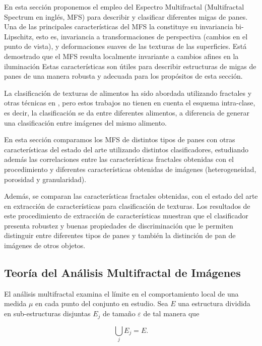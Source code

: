 En esta sección proponemos el empleo del Espectro Multifractal (Multifractal Spectrum en inglés, \acrshort{MFS}) \cite{Xu2009} para describir y clasificar diferentes migas de panes.
Una de las principales características del MFS la constituye su invariancia bi-Lipschitz, esto es, invariancia a transformaciones de perspectiva (cambios en el punto de vista), y deformaciones suaves de las texturas de las superficies.
Está demostrado que el MFS resulta localmente invariante a cambios afines en la iluminación
Estas características son útiles para describir estructuras de migas de panes de una manera robusta y adecuada para los propósitos de esta sección.

La clasificación de texturas de alimentos ha sido abordada utilizando fractales y otras técnicas en \cite{Zong2010,Bosch2011}, pero estos trabajos no tienen en cuenta el esquema intra-clase, es decir, la clasificación se da entre diferentes alimentos, a diferencia de generar una clasificación entre imágenes del mismo alimento.


En esta sección comparamos los MFS de distintos tipos de panes con otras características del estado del arte utilizando distintos clasificadores, estudiando además las correlaciones entre las características fractales obtenidas con el procedimiento y diferentes características obtenidas de imágenes (heterogeneidad, porosidad y granularidad).

Además, se comparan las características fractales obtenidas, con el estado del arte en extracción de características para clasificación de texturas.
Los resultados de este procedimiento de extracción de características muestran que el clasificador presenta robustez y buenas propiedades de discriminación que le permiten distinguir entre diferentes tipos de panes y también la distinción de pan de imágenes de otros objetos.

\subsection{Teoría del Análisis Multifractal de Imágenes}

El análisis multifractal examina el límite en el comportamiento local de una medida $\mu$ en cada punto del conjunto en estudio.
Sea $E$ una estructura dividida en sub-estructuras disjuntas $E_{j}$ de tamaño $\varepsilon$ de tal manera que

\begin{equation}
\displaystyle\bigcup_{j}E_{j} = E.
\end{equation}

